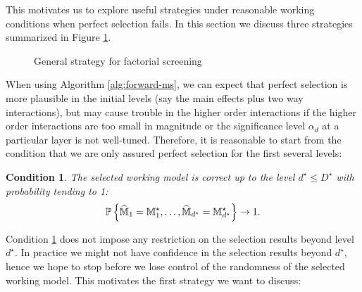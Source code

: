\documentclass[12pt]{article}
\newtheorem{condition}{Condition}
\begin{document}
This motivates us to explore useful strategies under reasonable working conditions when perfect selection fails. In this section we discuss three strategies summarized in Figure \ref{fig:general-strategy}.
\begin{figure}[!htbp]
\centering
{}
\caption{General strategy for factorial  screening}
\label{fig:general-strategy}
\end{figure}


When using Algorithm \ref{alg:forward-ms}, we can expect that perfect selection is more plausible in the initial levels (say the main effects plus two way interactions), but may cause trouble in the higher order interactions if the higher order interactions are too small in magnitude or the significance level $\alpha_d$ at a particular layer is not well-tuned. Therefore, it is  reasonable to start from the condition that we are only assured perfect selection for the first several levels:
\begin{condition}\label{cond:under-selection}
The selected working model is correct up to the level $d^\star \le D^\star$ with  probability tending to 1:
\begin{align*}
    {{\mathbb{P}}\left\{\widehat{{\mathbb{M}}}_1 = {\mathbb{M}}^\star_1, \dots, \widehat{{\mathbb{M}}}_{d^\star} = {\mathbb{M}}^\star_{d^\star}\right\}} \to 1. 
\end{align*}
\end{condition}

Condition \ref{cond:under-selection} does not impose any restriction on the selection results beyond level $d^\star$. In practice we might not have confidence in the selection results beyond $d^\star$, hence we hope to stop before we lose control of the randomness of the selected working model. This motivates the first strategy we want to discuss:
\end{document}
